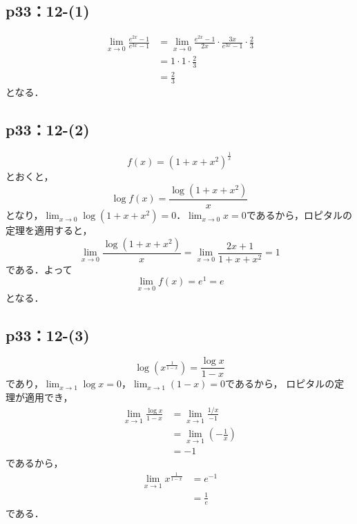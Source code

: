 \documentclass[uplatex,dvipdfmx,a4paper,10pt,fleqn]{jsarticle}
\begin{document}
\subsection*{p33：12-(1)}

\begin{tleftbar}
    \begin{align*} 
        \lim_{x \to 0} \frac{e^{2x}-1}{e^{3x}-1} & = \lim_{x \to 0} \frac{e^{2x}-1}{2x} \cdot \frac{3x}{e^{3x}-1} \cdot \frac{2}{3} \\
        & = 1 \cdot 1 \cdot \frac{2}{3} \\
        & = \frac{2}{3}
    \end{align*} 
    となる．
\end{tleftbar}


\subsection*{p33：12-(2)}

\begin{tleftbar}
    \[
        f(x)= (1+x+x^2)^{\frac{1}{x}}
    \]
    とおくと，
    \[
        \log f(x) = \frac{\log (1+x+x^2)}{x}
    \]
    となり，$\lim_{x \to 0} \log (1+x+x^2)=0$．$\lim_{x \to 0} x =0$であるから，ロピタルの定理を適用すると，
    \[
        \lim_{x \to 0} \frac{\log (1+x+x^2)}{x} =  \lim_{x \to 0}\frac{2x+1}{1+x+x^2} =1
    \]
    である．よって
    \[
        \lim_{x \to 0} f(x) = e^{1}=e
    \]
    となる．
\end{tleftbar}


\subsection*{p33：12-(3)}

\begin{tleftbar}
    \[
        \log (x^{\frac{1}{1-x}})= \frac{\log x}{1-x}
    \]
    であり，$\lim_{x \to 1} \log x = 0$，$\lim_{x \to 1} (1-x)=0$であるから，
    ロピタルの定理が適用でき，
    \begin{align*} 
        \lim_{ x\to 1} \frac{\log x}{1-x} & = \lim_{x \to 1} \frac{1/x}{-1} \\
        & = \lim_{x \to 1} \left(-\frac{1}{x} \right ) \\
        & = -1 
    \end{align*}
    であるから，
    \begin{align*} 
        \lim_{x \to 1} x^{\frac{1}{1-x}} &= e^{-1} \\
        &= \frac{1}{e}
    \end{align*}
    である．
\end{tleftbar}
\end{document}

